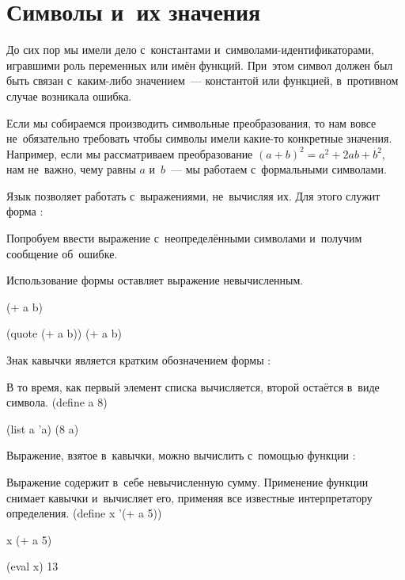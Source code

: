 \label{Less:symbols}

\section{Символы и~их значения}%
До сих пор мы имели дело с~константами и~символами-идентификаторами, игравшими роль переменных или имён функций. При~этом символ должен был быть связан с~каким-либо значением~--- константой или функцией, в~противном случае возникала ошибка.

Если мы собираемся производить символьные преобразования, то нам вовсе не~обязательно требовать чтобы символы имели какие-то конкретные значения. Например, если мы рассматриваем преобразование $(a + b)^2 = a^2 + 2ab + b^2$, нам не~важно, чему равны $a$ и~$b$~--- мы работаем с~формальными символами.

Язык \Scheme позволяет работать с~выражениями, не~вычисляя их. Для этого служит форма :

\begin{example}{Попробуем ввести выражение с~неопределёнными символами и~получим сообщение об~ошибке.

Использование формы  оставляет выражение невычисленным.}
\REPLin
  {(+ a b)}


\REPL
  {(quote (+ a b))}
  {(+ a b)}
\end{example}

Знак кавычки  является кратким обозначением формы :

\begin{example}{В то время, как первый элемент списка  вычисляется, второй остаётся в~виде символа.}
\REPLin
  {(define a 8)}

\REPL
  {(list a 'a)}
  {(8 a)}
\end{example}

Выражение, взятое в~кавычки, можно вычислить с~помощью функции :

\begin{example}{Выражение  содержит в~себе невычисленную сумму. Применение функции  снимает кавычки и~вычисляет его, применяя все известные интерпретатору определения.}
\REPLin
  {(define x '(+ a 5))}

\REPL
  {x}
  {(+ a 5)}

\REPL
  {(eval x)}
  {13}
\end{example}

